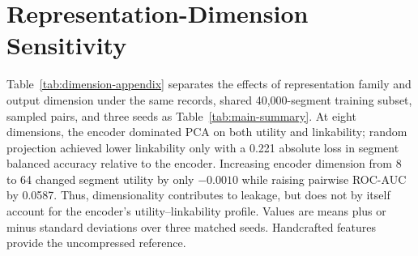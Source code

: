 \documentclass[journal]{IEEEtran}
\begin{document}
\section{Representation-Dimension Sensitivity}
\label{app:dimension}

Table~\ref{tab:dimension-appendix} separates the effects of representation
family and output dimension under the same records, shared 40,000-segment
training subset, sampled pairs, and three seeds as Table~\ref{tab:main-summary}.
At eight dimensions, the encoder dominated PCA on both utility and linkability;
random projection achieved lower linkability only with a 0.221 absolute loss
in segment balanced accuracy relative to the encoder. Increasing encoder
dimension from 8 to 64 changed segment utility by only $-0.0010$ while raising
pairwise ROC-AUC by 0.0587. Thus, dimensionality contributes to leakage, but
does not by itself account for the encoder's utility--linkability profile.
Values are means plus or minus standard deviations over three matched seeds.
Handcrafted features provide the uncompressed reference.

\begin{table}[ht]
\centering
\scriptsize
\setlength{\tabcolsep}{2.5pt}
\caption{Representation-dimension sensitivity.}
\label{tab:dimension-appendix}
\end{table}
\end{document}
